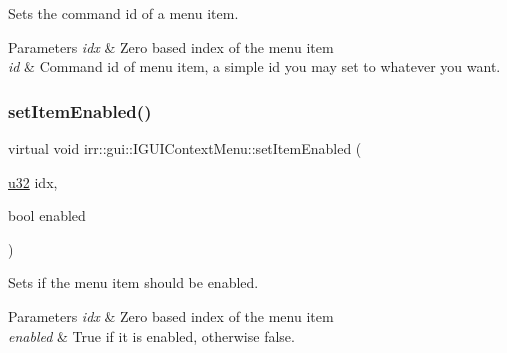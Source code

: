 Sets the command id of a menu item. 


\begin{DoxyParams}{Parameters}
{\em idx} & Zero based index of the menu item \\
\hline
{\em id} & Command id of menu item, a simple id you may set to whatever you want. \\
\hline
\end{DoxyParams}
\mbox{\label{classirr_1_1gui_1_1IGUIContextMenu_aa3c36d6cd990f3b488be2c7f419b89ee}} 
\subsubsection{\texorpdfstring{set\+Item\+Enabled()}{setItemEnabled()}\hspace{0.1cm}{\footnotesize\ttfamily [1/2]}}
{\footnotesize\ttfamily virtual void irr\+::gui\+::\+I\+G\+U\+I\+Context\+Menu\+::set\+Item\+Enabled (\begin{DoxyParamCaption}\item[{\hyperlink{namespaceirr_a0416a53257075833e7002efd0a18e804}{u32}}]{idx,  }\item[{bool}]{enabled }\end{DoxyParamCaption})\hspace{0.3cm}{\ttfamily [pure virtual]}}



Sets if the menu item should be enabled. 


\begin{DoxyParams}{Parameters}
{\em idx} & Zero based index of the menu item \\
\hline
{\em enabled} & True if it is enabled, otherwise false. \\
\hline
\end{DoxyParams}
\mbox{\label{classirr_1_1gui_1_1IGUIContextMenu_aa3c36d6cd990f3b488be2c7f419b89ee}} 
